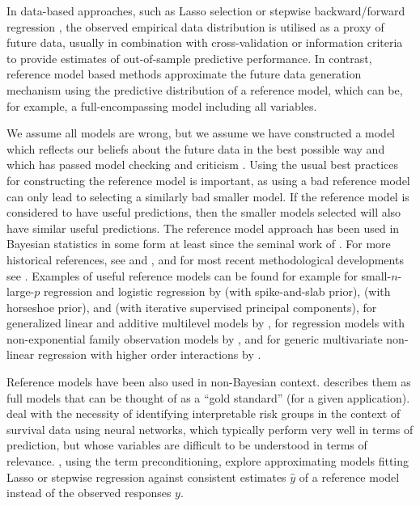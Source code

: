 \documentclass[a4]{article}
\theoremstyle{definition}
\begin{document}
In data-based approaches, such as Lasso selection
\citep{tibshirani1996regression} or stepwise backward/forward
regression \citep{venables2013modern,harrell2015regression}, the
observed empirical data distribution is utilised as a proxy of future
data, usually in combination with cross-validation or information
criteria to provide estimates of out-of-sample predictive
performance.  In contrast, reference model based methods approximate
the future data generation mechanism using the predictive distribution
of a reference model, which can be, for example, a full-encompassing
model including all variables.

We assume all models are wrong, but we assume we have constructed a
model which reflects our beliefs about the future data in the best
possible way and which has passed model checking and criticism
\citep{gelman2020bayesian,gabry2019visualization}.  Using the usual
best practices for constructing the reference model is important, as
using a bad reference model can only lead to selecting a similarly
bad smaller model. If the reference model is considered to have
useful predictions, then the smaller models selected will also have
similar useful predictions.
%
The reference model approach has been used in Bayesian statistics in
some form at least since the seminal work of
\citet{paper:reference_lindley}. For more historical references, see
\citet{vehtari2012survey} and \citet{paper:model_selection}, and for
most recent methodological developments see \citet{paper:projpred}.
%
Examples of useful reference models can be found for example for
small-$n$-large-$p$ regression and logistic regression by
\citet{piironen2017comparison} (with spike-and-slab prior),
\citet{Piironen:2015:Stan_projection} (with horseshoe prior), and
\citet{paper:projpred} (with iterative supervised principal
components), for generalized linear and additive multilevel models by
\citet{Catalina:2020:GAMM_projection}, for regression models with
non-exponential family observation models by
\citet{Catalina+etal:2021:latent_projection}, and for generic
multivariate non-linear regression with higher order interactions by
\citet{Piironen:2016:GPprojection}.

Reference models have been also used in non-Bayesian context.
\cite{harrell2015regression} describes them as full models that can be
thought of as a ``gold standard'' (for a given application).
\cite{faraggi2001understanding} deal with the necessity of
identifying interpretable risk groups in the context of survival data
using neural networks, which typically perform very well in terms of
prediction, but whose variables are difficult to be understood in
terms of relevance.  \cite{paul2008preconditioning}, using the term
preconditioning, explore approximating models fitting Lasso or
stepwise regression against consistent estimates $\hat{y}$ of a
reference model instead of the observed responses $y$.
\end{document}
